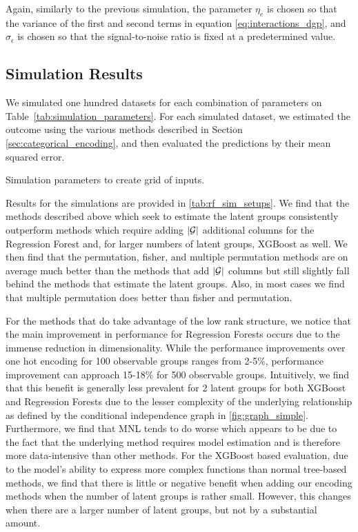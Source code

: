 \documentclass{article}
\theoremstyle{plain}
\theoremstyle{definition}
\theoremstyle{remark}
\begin{document}
\noindent Again, similarly to the previous simulation, the parameter $\eta_{e}$ is chosen so that the variance of the first and second terms in equation \ref{eq:interactions_dgp}, and $\sigma_{\epsilon}$ is chosen so that the signal-to-noise ratio is fixed at a predetermined value.


\subsection{Simulation Results}
\label{sec:simulation_results}






We simulated one hundred datasets for each combination of parameters on Table~\ref{tab:simulation_parameters}. For each simulated dataset, we estimated the outcome using the various methods described in Section \ref{sec:categorical_encoding}, and then evaluated the predictions by their mean squared error.

\begin{table}[htbp]
\centering

\caption{Simulation parameters to create grid of inputs.}
\label{tab:simulation_parameters}
\end{table}

Results for the simulations are provided in \ref{tab:rf_sim_setups}. We find that the methods described above which seek to estimate the latent groups consistently outperform methods which require adding $|\mathcal{G}|$ additional columns for the Regression Forest and, for larger numbers of latent groups, XGBoost as well. We then find that the permutation, fisher, and multiple permutation methods are on average much better than the methods that add $|\mathcal{G}|$ columns but still slightly fall behind the methods that estimate the latent groups. Also, in most cases we find that multiple permutation does better than fisher and permutation.

For the methods that do take advantage of the low rank structure, we notice that the main improvement in performance for Regression Forests occurs due to the immense reduction in dimensionality. While the performance improvements over one hot encoding for 100 observable groups ranges from 2-5\%, performance improvement can approach 15-18\% for 500 observable groups. Intuitively, we find that this benefit is generally less prevalent for 2 latent groups for both XGBoost and Regression Forests due to the lesser complexity of the underlying relationship as defined by the conditional independence graph in \ref{fig:graph_simple}. Furthermore, we find that MNL tends to do worse which appears to be due to the fact that the underlying method requires model estimation and is therefore more data-intensive than other methods. For the XGBoost based evaluation, due to the model's ability to express more complex functions than normal tree-based methods, we find that there is little or negative benefit when adding our encoding methods when the number of latent groups is rather small. However, this changes when there are a larger number of latent groups, but not by a substantial amount.
\end{document}
